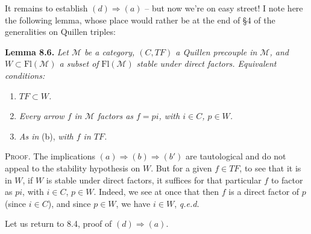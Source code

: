 \documentclass[11pt]{article}
\newcommand{\msp}[1]{\marginpar{\footnotesize [#1]}}
\begin{document}
It remains to establish $(d) \Longrightarrow (a)$ – but now we're on easy street! I note here the following lemma, whose place would rather be at the end of \S4 of the generalities on Quillen triples:

\msp{page 109}

\textbf{Lemma 8.6.} \textit{Let $\mathcal{M}$ be a category, $(C,TF)$ a Quillen precouple in $\mathcal{M}$, and $W \subset \mathrm{Fl}(\mathcal{M})$ a subset of} $\mathrm{Fl}(\mathcal{M})$ \textit{stable under direct factors. Equivalent conditions:}
\begin{enumerate}[leftmargin=2.5em]
\item[a)] \textit{$TF \subset W$.}
\item[b)] \textit{Every arrow $f$ in $\mathcal{M}$ factors as $f = pi$, with $i \in C$, $p \in W$.}
\item[b$'$)] \textit{As in} (b), \textit{with $f$ in $TF$.}
\end{enumerate}

\textsc{Proof}. The implications $(a) \Longrightarrow (b) \Longrightarrow (b')$ are tautological and do not appeal to the stability hypothesis on $W$. But for a given $f \in TF$, to see that it is in $W$, if $W$ is stable under direct factors, it suffices for that particular $f$ to factor as $pi$, with $i \in C$, $p \in W$. Indeed, we see at once that then $f$ is a direct factor of $p$ (since $i \in C$), and since $p \in W$, we have $i \in W$, \quad \textit{q.e.d.} %

Let us return to 8.4, proof of $(d) \Longrightarrow (a)$.



\msp{page 110}
\end{document}
